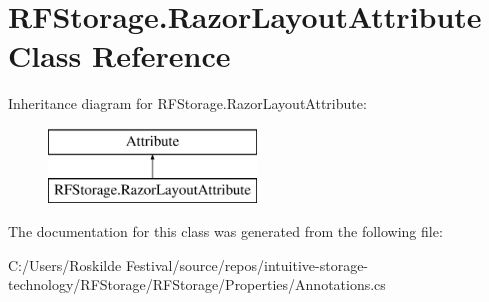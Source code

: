 \section{R\+F\+Storage.\+Razor\+Layout\+Attribute Class Reference}
\label{class_r_f_storage_1_1_razor_layout_attribute}
Inheritance diagram for R\+F\+Storage.\+Razor\+Layout\+Attribute\+:\begin{figure}[H]
\begin{center}
\leavevmode
\includegraphics[height=2.000000cm]{class_r_f_storage_1_1_razor_layout_attribute}
\end{center}
\end{figure}


The documentation for this class was generated from the following file\+:\begin{DoxyCompactItemize}
\item 
C\+:/\+Users/\+Roskilde Festival/source/repos/intuitive-\/storage-\/technology/\+R\+F\+Storage/\+R\+F\+Storage/\+Properties/Annotations.\+cs\end{DoxyCompactItemize}
